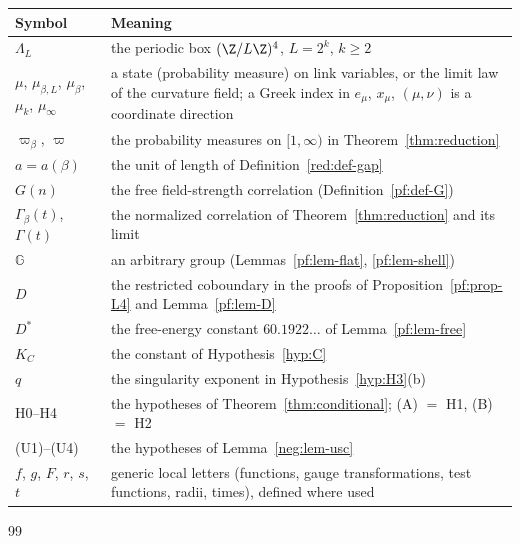 \begin{center}
\small
\begin{tabular}{@{}p{}p{}@{}}
\toprule
Symbol & Meaning \\
\midrule
$\Lambda_L$ & the periodic box $(\Z/L\Z)^4$, $L=2^k$, $k\ge2$ \\
$\mu$, $\mu_{\beta,L}$, $\mu_\beta$, $\mu_k$, $\mu_\infty$ & a state (probability measure) on link variables, or the limit law of the curvature field; a Greek index in $e_\mu$, $x_\mu$, $(\mu,\nu)$ is a coordinate direction \\
$\varpi_\beta$, $\varpi$ & the probability measures on $[1,\infty)$ in Theorem~\ref{thm:reduction} \\
$a=a(\beta)$ & the unit of length of Definition~\ref{red:def-gap} \\
$G(n)$ & the free field-strength correlation (Definition~\ref{pf:def-G}) \\
$\Gamma_\beta(t)$, $\Gamma(t)$ & the normalized correlation of Theorem~\ref{thm:reduction} and its limit \\
$\mathbb G$ & an arbitrary group (Lemmas~\ref{pf:lem-flat}, \ref{pf:lem-shell}) \\
$D$ & the restricted coboundary in the proofs of Proposition~\ref{pf:prop-L4} and Lemma~\ref{pf:lem-D} \\
$D^*$ & the free-energy constant $60.1922\ldots$ of Lemma~\ref{pf:lem-free} \\
$K_C$ & the constant of Hypothesis~\ref{hyp:C} \\
$q$ & the singularity exponent in Hypothesis~\ref{hyp:H3}(b) \\
H0--H4 & the hypotheses of Theorem~\ref{thm:conditional}; (A) $=$ H1, (B) $=$ H2 \\
(U1)--(U4) & the hypotheses of Lemma~\ref{neg:lem-usc} \\
$f$, $g$, $F$, $r$, $s$, $t$ & generic local letters (functions, gauge transformations, test functions, radii, times), defined where used \\
\bottomrule
\end{tabular}
\end{center}






\begin{thebibliography}{99}

\end{thebibliography}

